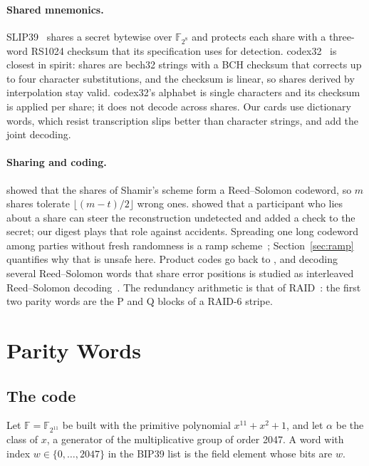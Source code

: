 \documentclass[numeric]{anvil-paper}
\newcommand{\F}{\mathbb{F}}
\begin{document}
\paragraph{Shared mnemonics.}
SLIP39~\citep{slip39} shares a secret bytewise over $\F_{2^8}$ and protects each
share with a three-word RS1024 checksum that its specification uses for
detection. codex32~\citep{bip93} is closest in spirit: shares are bech32 strings
with a BCH checksum that corrects up to four character substitutions, and the
checksum is linear, so shares derived by interpolation stay valid. codex32's
alphabet is single characters and its checksum is applied per share; it does
not decode across shares. Our cards use dictionary words, which resist
transcription slips better than character strings, and add the joint decoding.

\paragraph{Sharing and coding.}
\citet{mceliece1981sharing} showed that the shares of Shamir's scheme form a
Reed--Solomon codeword, so $m$ shares tolerate $\lfloor (m-t)/2\rfloor$ wrong
ones. \citet{tompa1989how} showed that a participant who lies about a share can
steer the reconstruction undetected and added a check to the secret; our digest
plays that role against accidents. Spreading one long codeword among parties
without fresh randomness is a ramp scheme~\citep{blakley2007security,
franklin1992communication}; Section~\ref{sec:ramp} quantifies why that is unsafe
here. Product codes go back to \citet{elias1954error}, and decoding several
Reed--Solomon words that share error positions is studied as interleaved
Reed--Solomon decoding~\citep{schmidt2009collaborative}. The redundancy
arithmetic is that of RAID~\citep{patterson1988case}: the first two parity
words are the P and Q blocks of a RAID-6 stripe.

\section{Parity Words}
\label{sec:parity}

\subsection{The code}

Let $\F=\F_{2^{11}}$ be built with the primitive polynomial $x^{11}+x^2+1$, and
let $\alpha$ be the class of $x$, a generator of the multiplicative group of
order 2047. A word with index $w\in\{0,\dots,2047\}$ in the BIP39 list is the
field element whose bits are $w$.
\end{document}
